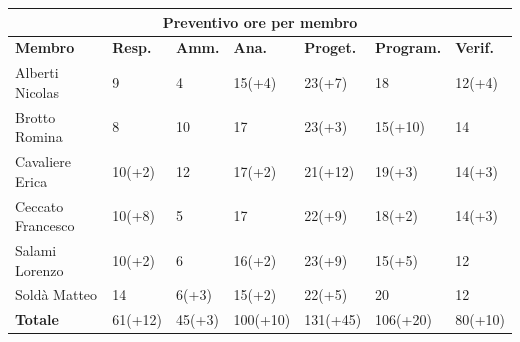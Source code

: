 \documentclass[a4paper, 12pt]{article}
\begin{document}
\begin{center}
	\begin{tabularx}{\textwidth}{|X|X|X|X|X|X|X|}
		\hline
		\multicolumn{7}{|c|}{\textbf{Preventivo ore per membro}}                                            \\
		\hline
		\hline
		\textbf{Membro}   & \textbf{Resp.}    & \textbf{Amm.}   & \textbf{Ana.} &
		\textbf{Proget.}  & \textbf{Program.} & \textbf{Verif.}                                             \\
		\hline
		Alberti Nicolas   & 9                 & 4               & 15(+4)            & 23(+7)  		& 18 		 & 12(+4)      \\
		\hline
		Brotto Romina     & 8                & 10              & 17       		& 23(+3)    	 & 15(+10)       & 14 \\
		\hline
		Cavaliere Erica   & 10(+2)                & 12             & 17(+2)        & 21(+12) 		 & 19(+3)	 	 & 14(+3)     \\
		\hline
		Ceccato Francesco & 10(+8)                & 5            & 17            & 22(+9) 		& 18(+2) 			& 14(+3)     \\
		\hline
		Salami Lorenzo    & 10(+2)                & 6               & 16(+2)      & 23(+9) 		 & 15(+5)    	  & 12 \\
		\hline
		Soldà Matteo      & 14                & 6(+3)           & 15(+2)           & 22(+5)    	 & 20 		& 12  \\
		\hline
		\hline
		\textbf{Totale}   & 61(+12)            & 45(+3)          & 100(+10)        & 131(+45)  & 106(+20) & 80(+10) \\
		\hline
	\end{tabularx}\\[8pt]
	\mbox{}\\
\end{center}

\newpage
\end{document}
